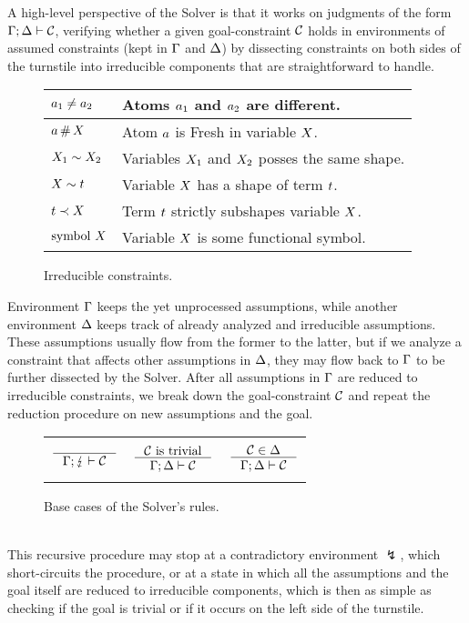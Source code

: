\documentclass[english, mgr]{iithesis}
\newcommand{\solverRule}{\vdash}
\begin{document}
A high-level perspective of the Solver is that it works on judgments of the form
$\cEnv; \icEnv \solverRule \sconstr$, verifying whether a given goal-constraint $\mathcal{C}$
holds in environments of assumed constraints (kept in $\Gamma$ and $\Delta$)
by dissecting constraints on both sides of the turnstile into
irreducible components that are straightforward to handle.
\begin{figure}
  \centering
  \begin{tabularx}{\textwidth}{|l|X|}
    \hline
    $a_1 \neq a_2$
    & Atoms $a_1$ and $a_2$ are different.
    \\ \hline
    $a   \,\#\, X$
    & Atom $a$ is {Fresh} in variable $X$.
    \\ \hline
    $X_1 \sim  X_2$
    & Variables $X_1$ and $X_2$ posses the same shape.
    \\ \hline
    $X   \sim  t$
    & Variable $X$ has a shape of term $t$.
    \\ \hline
    $t    \prec  X$
    & Term $t$ strictly subshapes variable $X$.
    \\ \hline
    $\text{symbol } X$
    & Variable $X$ is some functional symbol.
    \\ \hline
  \end{tabularx}
  \caption{Irreducible constraints.}
  \label{fig:irreducible-constraints}
\end{figure}

Environment $\Gamma$ keeps the yet unprocessed assumptions,
while another environment $\Delta$ keeps track of already analyzed and irreducible assumptions.
These assumptions usually flow from the former to the latter, but if we analyze
a constraint that affects other assumptions in $\Delta$,
they may flow back to $\Gamma$ to be further dissected by the Solver.
After all assumptions in $\Gamma$ are reduced to irreducible constraints,
we break down the goal-constraint $\mathcal{C}$ and repeat the reduction procedure on
new assumptions and the goal.
\begin{figure}[htpb]
  \centering
    \begin{tabularx}{\textwidth}{|CCC|}
    \hline & & \\ $
      \inference{
      }{
        \cEnv ; \lightning \solverRule \sconstr
      }
      $ & $
      \inference{
        \sconstr \text{ is trivial}
      }{
        \cEnv ; \icEnv \solverRule \sconstr
      } $ & $
      \inference{
        \sconstr \in \icEnv
      }{
        \cEnv ; \icEnv \solverRule \sconstr
      } $ \\ & & \\ \hline
    \end{tabularx}
  \caption{Base cases of the Solver's rules.}
  \label{fig:solver-base}
\end{figure}
\\
This recursive procedure may stop at a contradictory environment $\lightning$,
which short-circuits the procedure, or at
a state in which all the assumptions and the goal itself are reduced to irreducible components,
which is then as simple as checking if the goal is trivial or if it
occurs on the left side of the turnstile.
\end{document}
